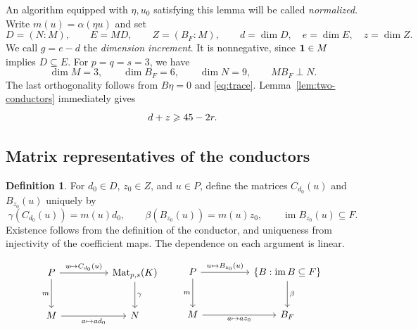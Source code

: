 \documentclass[11pt,a4paper]{article}
\numberwithin{equation}{section}
\theoremstyle{plain}
\theoremstyle{definition}
\newtheorem{definition}[theorem]{Definition}
\DeclareMathOperator{\im}{im}\DeclareMathOperator{\supp}{supp}
\DeclareMathOperator{\Mat}{Mat}\DeclareMathOperator{\Span}{span}
\begin{document}
An algorithm equipped with $\eta,u_0$ satisfying this lemma will be
called \emph{normalized}. Write $m(u)=\alpha(\eta u)$ and set
\[
 D=(N:M),\qquad E=MD,\qquad Z=(B_F:M),\qquad
 d=\dim D,\quad e=\dim E,\quad z=\dim Z.
\]
We call $g=e-d$ the \emph{dimension increment}.
It is nonnegative, since $\mathbf1\in M$ implies $D\subseteq E$.
For $p=q=s=3$, we have
\[
 \dim M=3,\qquad\dim B_F=6,\qquad\dim N=9,\qquad MB_F\perp N.
\]
The last orthogonality follows from $B\eta=0$ and \eqref{eq:trace}.
Lemma~\ref{lem:two-conductors} immediately gives
\begin{equation}\label{eq:dz}
 d+z\geqslant45-2r.
\end{equation}

\subsection{Matrix representatives of the conductors}

\begin{definition}
For $d_0\in D$, $z_0\in Z$, and $u\in P$, define the matrices
$C_{d_0}(u)$ and $B_{z_0}(u)$ uniquely by
\[
 \gamma(C_{d_0}(u))=m(u)d_0,\qquad
 \beta(B_{z_0}(u))=m(u)z_0,\qquad \im B_{z_0}(u)\subseteq F.
\]
Existence follows from the definition of the conductor, and uniqueness
from injectivity of the coefficient maps. The dependence on each
argument is linear.
\end{definition}
\[
\begin{tikzcd}[column sep=huge,row sep=large]
 P\arrow[r,"u\mapsto C_{d_0}(u)"]\arrow[d,"m"']&
 \Mat_{p,s}(K)\arrow[d,"\gamma"]\\
 M\arrow[r,"a\mapsto ad_0"']&N
\end{tikzcd}
\qquad
\begin{tikzcd}[column sep=huge,row sep=large]
 P\arrow[r,"u\mapsto B_{z_0}(u)"]\arrow[d,"m"']&
 \{B:\im B\subseteq F\}\arrow[d,"\beta"]\\
 M\arrow[r,"a\mapsto az_0"']&B_F
\end{tikzcd}
\]
\end{document}
